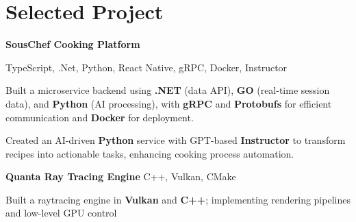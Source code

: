 
\newenvironment{twocolentry_proj}[2][]{
    \onecolentry
    \def\secondColumn{#2}
    \setcolumnwidth{\fill, 9 cm}
    \begin{paracol}{2}
}{
    \switchcolumn \raggedleft \secondColumn
    \end{paracol}
    \endonecolentry
} %

\vspace{5 pt - 0.4 cm}
\section{Selected Project}
\begin{twocolentry_proj}{
    \mbox{}%
}

\textbf{SousChef Cooking Platform}
\end{twocolentry_proj}

\vspace{0.10 cm}
\begin{onecolentry}
    \small TypeScript, .Net, Python, React Native, gRPC, Docker, Instructor 
    \begin{highlights}
        \item Built a microservice backend using  \textbf{.NET} (data API),  \textbf{GO} (real-time session data), and  \textbf{Python} (AI processing), with \textbf{gRPC} and \textbf{Protobufs} for efficient communication and \textbf{Docker} for deployment.
        \item Created an AI-driven  \textbf{Python} service with GPT-based \textbf{Instructor} to transform recipes into actionable tasks, enhancing cooking process automation.
    \end{highlights}
\end{onecolentry}


\vspace{0.10 cm}
\begin{twocolentry_proj}{
    \mbox{}%
}
\fontsize{11 pt}{11 pt}\textbf{Quanta Ray Tracing Engine} C++, Vulkan, CMake
\end{twocolentry_proj}
\begin{onecolentry}
    \begin{highlights}
        \item Built a raytracing engine in \textbf{Vulkan} and \textbf{C++}; implementing rendering pipelines and low-level GPU control
    \end{highlights}
\end{onecolentry}